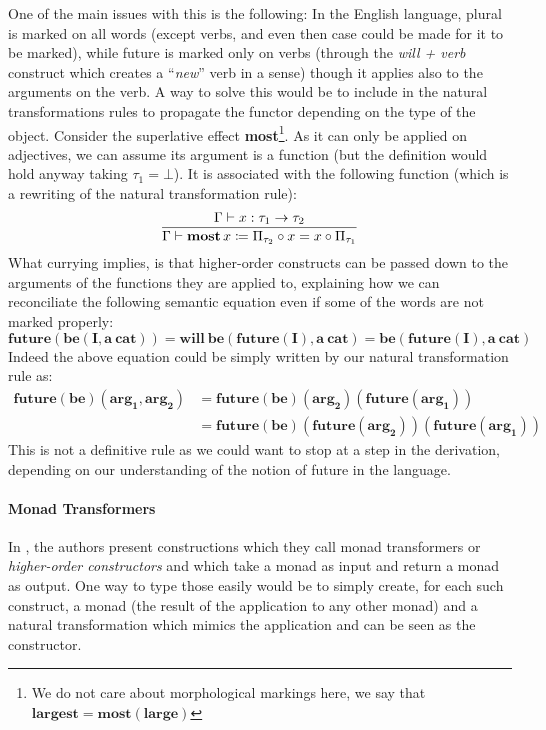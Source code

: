 One of the main issues with this is the following:
In the English language, plural is marked on all words (except verbs, and even
then case could be made for it to be marked), while future is marked only on
verbs (through the \textit{will + verb} construct which creates a ``\emph{new}''
verb in a sense) though it applies also to the arguments on the verb.
A way to solve this would be to include in the natural transformations rules to
propagate the functor depending on the type of the object.
Consider the superlative effect \textbf{most}\footnote{We do not care about
	morphological markings here, we say that
	$\mathbf{largest} = \mathbf{most} \left(\mathbf{large}\right)$}.
As it can only be applied on adjectives, we can assume its argument is a
function (but the definition would hold anyway taking $\tau_{1} = \bot$).
It is associated with the following function (which is a rewriting of the
natural transformation rule):
\begin{equation*}
	\frac{\Gamma\vdash x: \tau_{1} \to \tau_{2}}{\Gamma\vdash \mathbf{most}\, x \coloneqq
		\Pi_{\tau_{2}} \circ x = x \circ \Pi_{\tau_{1}}}
\end{equation*}
What currying implies, is that higher-order constructs can be passed down
to the arguments of the functions they are applied to, explaining how we can
reconciliate the following semantic equation even if some of the words are not
marked properly:
\begin{equation*}
	\mathbf{future\left(be\left( I, a\ cat \right)\right)
		= will\ be\left( future\left( I \right), a\ cat \right)
		= be\left( future\left( I \right), a\ cat \right)}
\end{equation*}
Indeed the above equation could be simply written by our natural transformation
rule as:
\begin{equation*}
	\begin{aligned}
		\mathbf{future\left( be \right)\left( arg_{1}, arg_{2} \right)}
		 & = \mathbf{future\left( be \right)\left( arg_{2} \right)\left( future\left( arg_{1} \right) \right)}                           \\
		 & = \mathbf{future \left( be \right) \left( future \left( arg_{2} \right) \right) \left( future \left( arg_{1} \right) \right)}
	\end{aligned}
\end{equation*}
This is not a definitive rule as we could want to stop at a step in the
derivation, depending on our understanding of the notion of future in
the language.

\paragraph{Monad Transformers}
In \cite{bumfordEffectdrivenInterpretationFunctors2025}, the authors present
constructions which they call monad transformers or \emph{higher-order
	constructors} and which take a monad as input and return a monad as output.
One way to type those easily would be to simply create, for each such
construct, a monad (the result of the application to any other monad) and a
natural transformation which mimics the application and can be seen as the
constructor.


